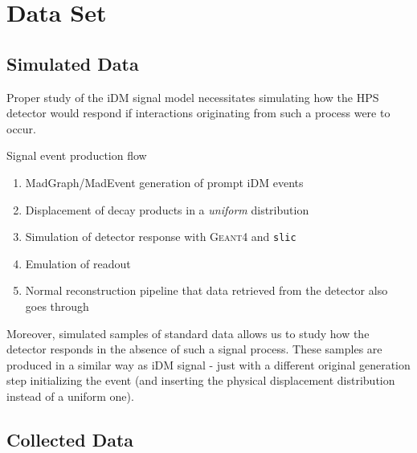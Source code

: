 \chapter{Data Set}
\label{chapter:hps:dataset}

\section{Simulated Data} \label{sec:hps:sim}
Proper study of the iDM signal model necessitates simulating how the HPS detector
would respond if interactions originating from such a process were to occur.

Signal event production flow
\begin{enumerate}
	\item {\sc MadGraph/MadEvent} generation of prompt iDM events
	\item Displacement of decay products in a \emph{uniform} distribution
	\item Simulation of detector response with \textsc{Geant}4 and \texttt{slic}
	\item Emulation of readout
	\item Normal reconstruction pipeline that data retrieved from the detector
	      also goes through
\end{enumerate}

Moreover, simulated samples of standard data allows us to study how the detector
responds in the absence of such a signal process. These samples are produced in
a similar way as iDM signal - just with a different original generation step
initializing the event (and inserting the physical displacement distribution
instead of a uniform one).

\section{Collected Data} \label{sec:hps:data}

